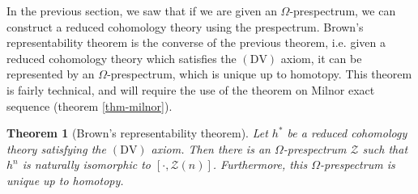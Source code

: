\documentclass[12pt, notitlepage]{article}
\newtheorem{thm}{Theorem}[section]
\theoremstyle{definition}
\newcommand{\calz}{\mathcal{Z}}
\begin{document}
In the previous section, we saw that if we are given an $\Omega$-prespectrum, we can construct a
reduced cohomology theory using the prespectrum. Brown's representability theorem is the converse of
the previous theorem, i.e. given a reduced cohomology theory which satisfies the $(\mathrm{DV})$
axiom, it can be represented by an $\Omega$-prespectrum, which is unique up to homotopy. This
theorem is fairly technical, and will require the use of the theorem on Milnor exact sequence
(theorem \ref{thm-milnor}).

\begin{thm}[Brown's representability theorem]
  Let $h^{\ast}$ be a reduced cohomology theory satisfying the $(\mathrm{DV})$ axiom. Then there is
  an $\Omega$-prespectrum $\calz$ such that $h^{n}$ is naturally isomorphic to
  $\left[\cdot, \calz(n) \right]$. Furthermore, this $\Omega$-prespectrum is unique up to homotopy.
\end{thm}
\end{document}
